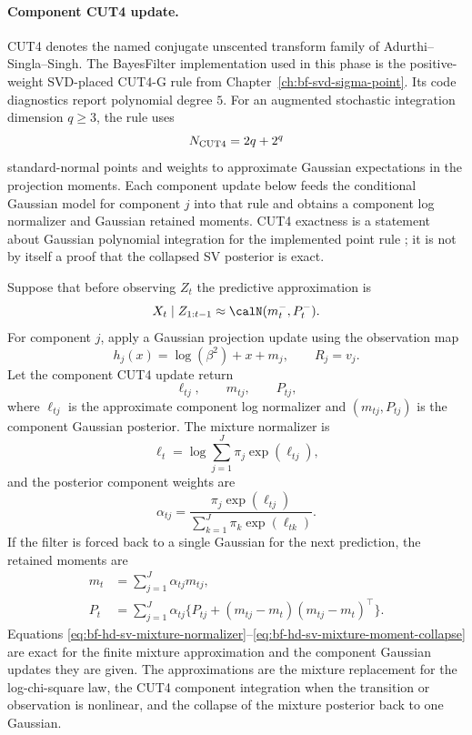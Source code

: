 \paragraph{Component CUT4 update.}
CUT4 denotes the named conjugate unscented transform family of
Adurthi--Singla--Singh.  The BayesFilter implementation used in this phase is
the positive-weight SVD-placed CUT4-G rule from
Chapter~\ref{ch:bf-svd-sigma-point}.  Its code diagnostics report polynomial
degree \(5\).  For an augmented stochastic integration dimension \(q\ge3\),
the rule uses
\[
  N_{\rm CUT4}=2q+2^q
\]
standard-normal points and weights to approximate Gaussian expectations in the
projection moments.  Each component update below feeds the conditional
Gaussian model for component \(j\) into that rule and obtains a component log
normalizer and Gaussian retained moments.  CUT4 exactness is a statement about
Gaussian polynomial integration for the implemented point rule
\citep{adurthi2012cut,adurthi2012cutfiltering}; it is not by itself a proof
that the collapsed SV posterior is exact.

Suppose that before observing \(Z_t\) the predictive approximation is
\[
  X_t\mid Z_{1:t-1}\approx\calN(m_t^-,P_t^-).
\]
For component \(j\), apply a Gaussian projection update using the observation
map
\[
  h_j(x)=\log(\beta^2)+x+m_j,
  \qquad R_j=v_j.
\]
Let the component CUT4 update return
\[
  \ell_{tj},\qquad m_{tj},\qquad P_{tj},
  \label{eq:bf-hd-sv-component-cut4}
\]
where \(\ell_{tj}\) is the approximate component log normalizer and
\((m_{tj},P_{tj})\) is the component Gaussian posterior.  The mixture
normalizer is
\begin{equation}
  \ell_t
  =
  \log\sum_{j=1}^J \pi_j\exp(\ell_{tj}),
  \label{eq:bf-hd-sv-mixture-normalizer}
\end{equation}
and the posterior component weights are
\begin{equation}
  \alpha_{tj}
  =
  \frac{\pi_j\exp(\ell_{tj})}{\sum_{k=1}^J\pi_k\exp(\ell_{tk})}.
  \label{eq:bf-hd-sv-component-weights}
\end{equation}
If the filter is forced back to a single Gaussian for the next prediction, the
retained moments are
\begin{align}
  m_t &= \sum_{j=1}^J \alpha_{tj}m_{tj},\\
  P_t &=
  \sum_{j=1}^J \alpha_{tj}
  \{P_{tj}+(m_{tj}-m_t)(m_{tj}-m_t)^\top\}.
  \label{eq:bf-hd-sv-mixture-moment-collapse}
\end{align}
Equations \eqref{eq:bf-hd-sv-mixture-normalizer}--\eqref{eq:bf-hd-sv-mixture-moment-collapse}
are exact for the finite mixture approximation and the component Gaussian
updates they are given.  The approximations are the mixture replacement for
the log-chi-square law, the CUT4 component integration when the transition or
observation is nonlinear, and the collapse of the mixture posterior back to
one Gaussian.

